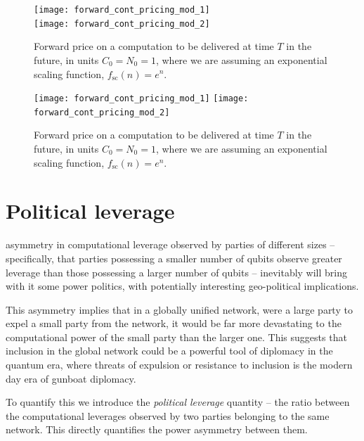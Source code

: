 \pubmode
\begin{figure}[!htbp]
\texttt{[image: forward\_cont\_pricing\_mod\_1]}\\
\texttt{[image: forward\_cont\_pricing\_mod\_2]}
\captionspacefig \caption{Forward price on a computation to be delivered at time $T$ in the future, in units \mbox{$C_0=N_0=1$}, where we are assuming an exponential scaling function, \mbox{$f_\mathrm{sc}(n)=e^n$}.}\label{fig:forward_cont_pricing_mod}
\end{figure}
\else
\begin{figure}[!htbp]
\texttt{[image: forward\_cont\_pricing\_mod\_1]}
\texttt{[image: forward\_cont\_pricing\_mod\_2]}
\captionspacefig \caption{Forward price on a computation to be delivered at time $T$ in the future, in units \mbox{$C_0=N_0=1$}, where we are assuming an exponential scaling function, \mbox{$f_\mathrm{sc}(n)=e^n$}.}\label{fig:forward_cont_pricing_mod}
\end{figure}
\fi

%
%

\section{Political leverage}\label{sec:political_lev}

 asymmetry in computational leverage observed by parties of different sizes -- specifically, that parties possessing a smaller number of qubits observe greater leverage than those possessing a larger number of qubits -- inevitably will bring with it some power politics, with potentially interesting geo-political implications.

This asymmetry implies that in a globally unified network, were a large party to expel a small party from the network, it would be far more devastating to the computational power of the small party than the larger one. This suggests that inclusion in the global network could be a powerful tool of diplomacy in the quantum era, where threats of expulsion or resistance to inclusion is the modern day era of gunboat diplomacy.

To quantify this we introduce the \textit{political leverage} quantity -- the ratio between the computational leverages observed by two parties belonging to the same network. This directly quantifies the power asymmetry between them.


